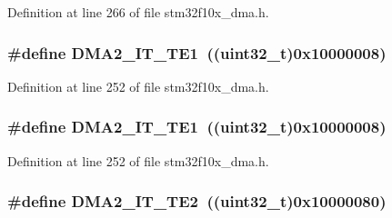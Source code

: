 Definition at line 266 of file stm32f10x\+\_\+dma.\+h.

\subsubsection[{\texorpdfstring{D\+M\+A2\+\_\+\+I\+T\+\_\+\+T\+E1}{DMA2_IT_TE1}}]{\setlength{\rightskip}{0pt plus 5cm}\#define D\+M\+A2\+\_\+\+I\+T\+\_\+\+T\+E1~(({\bf uint32\+\_\+t})0x10000008)}\hypertarget{group___d_m_a__interrupts__definition_ga912b0a1e7104dc70d25ca1a33338b6eb}{}\label{group___d_m_a__interrupts__definition_ga912b0a1e7104dc70d25ca1a33338b6eb}


Definition at line 252 of file stm32f10x\+\_\+dma.\+h.

\subsubsection[{\texorpdfstring{D\+M\+A2\+\_\+\+I\+T\+\_\+\+T\+E1}{DMA2_IT_TE1}}]{\setlength{\rightskip}{0pt plus 5cm}\#define D\+M\+A2\+\_\+\+I\+T\+\_\+\+T\+E1~(({\bf uint32\+\_\+t})0x10000008)}\hypertarget{group___d_m_a__interrupts__definition_ga912b0a1e7104dc70d25ca1a33338b6eb}{}\label{group___d_m_a__interrupts__definition_ga912b0a1e7104dc70d25ca1a33338b6eb}


Definition at line 252 of file stm32f10x\+\_\+dma.\+h.

\subsubsection[{\texorpdfstring{D\+M\+A2\+\_\+\+I\+T\+\_\+\+T\+E2}{DMA2_IT_TE2}}]{\setlength{\rightskip}{0pt plus 5cm}\#define D\+M\+A2\+\_\+\+I\+T\+\_\+\+T\+E2~(({\bf uint32\+\_\+t})0x10000080)}\hypertarget{group___d_m_a__interrupts__definition_ga5f32004b492a225495c9c1dcd5002042}{}\label{group___d_m_a__interrupts__definition_ga5f32004b492a225495c9c1dcd5002042}


